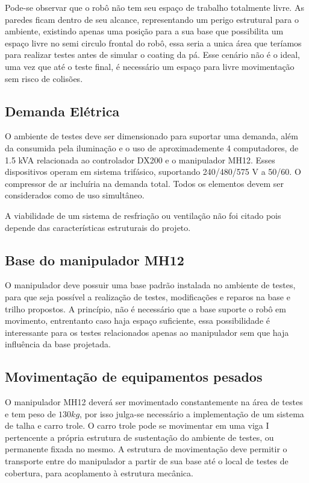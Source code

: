 Pode-se observar que o robô não tem seu espaço de trabalho totalmente livre. As
paredes ficam dentro de seu alcance, representando um perigo estrutural
para o ambiente,  existindo apenas uma posição para a sua base que possibilita
um espaço livre no semi circulo frontal do robô, essa seria a unica área que teríamos para realizar testes 
antes de simular o coating da pá. Esse cenário não é o ideal, uma vez que até o teste final, 
é necessário um espaço para livre movimentação sem risco de colisões. 

\subsection{Demanda Elétrica}

O ambiente de testes deve ser dimensionado para suportar uma demanda, além da
consumida pela iluminação e o uso de aproximademente 4 computadores, de 1.5 kVA
relacionada ao controlador DX200 e o manipulador MH12. 
Esses dispositivos operam em sistema trifásico, suportando 240/480/575 V a 50/60. 
O compressor de ar incluíria %
na demanda total.
Todos os elementos devem ser considerados como de uso
simultâneo. 

A viabilidade de um sistema de resfriação ou ventilação não foi citado pois
depende das características estruturais do projeto. 

\subsection{Base do manipulador MH12}
O manipulador deve possuir uma base padrão instalada no ambiente de testes, para
que seja possível a realização de testes, modificações e reparos na base e
trilho propostos. 
A princípio, não é necessário que a base suporte o robô em
movimento, entrentanto caso haja espaço suficiente, essa possibilidade é
interessante para os testes relacionados apenas ao manipulador sem que haja
influência da base projetada.


\subsection{Movimentação de equipamentos pesados}
O manipulador MH12 deverá ser movimentado constantemente na área de testes e tem
peso de $130kg$, por isso julga-se necessário a implementação de um sistema de
talha e carro trole. O carro trole pode se movimentar em uma viga I pertencente
a própria estrutura de sustentação do ambiente de testes, ou permanente fixada
no mesmo. A estrutura de movimentação deve permitir o transporte entre do
manipulador a partir de sua base até o local de testes de cobertura, para
acoplamento à estrutura mecânica.


